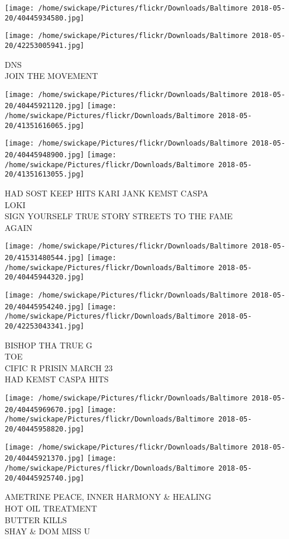 \documentclass[10pt,letterpaper]{article}
\begin{document}
\texttt{[image: /home/swickape/Pictures/flickr/Downloads/Baltimore 2018-05-20/40445934580.jpg]}

\vspace{0.25in}
\texttt{[image: /home/swickape/Pictures/flickr/Downloads/Baltimore 2018-05-20/42253005941.jpg]}

DNS\\
JOIN THE MOVEMENT
\pagebreak

\texttt{[image: /home/swickape/Pictures/flickr/Downloads/Baltimore 2018-05-20/40445921120.jpg]}
\texttt{[image: /home/swickape/Pictures/flickr/Downloads/Baltimore 2018-05-20/41351616065.jpg]}

\texttt{[image: /home/swickape/Pictures/flickr/Downloads/Baltimore 2018-05-20/40445948900.jpg]}
\texttt{[image: /home/swickape/Pictures/flickr/Downloads/Baltimore 2018-05-20/41351613055.jpg]}

HAD SOST KEEP HITS KARI JANK KEMST CASPA\\
LOKI\\
SIGN YOURSELF TRUE STORY STREETS TO THE FAME\\
AGAIN
\pagebreak

\texttt{[image: /home/swickape/Pictures/flickr/Downloads/Baltimore 2018-05-20/41531480544.jpg]}
\texttt{[image: /home/swickape/Pictures/flickr/Downloads/Baltimore 2018-05-20/40445944320.jpg]}

\texttt{[image: /home/swickape/Pictures/flickr/Downloads/Baltimore 2018-05-20/40445954240.jpg]}
\texttt{[image: /home/swickape/Pictures/flickr/Downloads/Baltimore 2018-05-20/42253043341.jpg]}

BISHOP THA TRUE G\\
TOE\\
CIFIC R PRISIN MARCH 23\\
HAD KEMST CASPA HITS
\pagebreak

\texttt{[image: /home/swickape/Pictures/flickr/Downloads/Baltimore 2018-05-20/40445969670.jpg]}
\texttt{[image: /home/swickape/Pictures/flickr/Downloads/Baltimore 2018-05-20/40445958820.jpg]}

\texttt{[image: /home/swickape/Pictures/flickr/Downloads/Baltimore 2018-05-20/40445921370.jpg]}
\texttt{[image: /home/swickape/Pictures/flickr/Downloads/Baltimore 2018-05-20/40445925740.jpg]}

AMETRINE PEACE, INNER HARMONY \& HEALING\\
HOT OIL TREATMENT\\
BUTTER KILLS\\
SHAY \& DOM MISS U
\pagebreak
\end{document}
